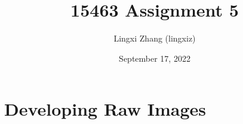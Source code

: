 \documentclass{report}
\title{15463 Assignment 5}
\author{Lingxi Zhang (lingxiz)}
\date{September 17, 2022}
\begin{document}
\maketitle

\section{Developing Raw Images}
\end{document}
